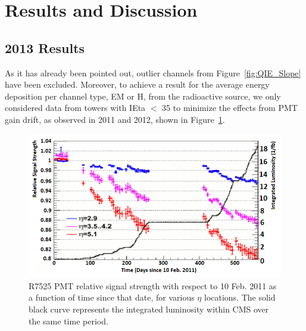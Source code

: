 \section{Results and Discussion}
\subsection{2013 Results}
As it has already been pointed out, outlier channels from Figure~\ref{fig:QIE_Slope} have been excluded.
Moreover, to achieve a result for the average energy deposition per channel type,
EM or H, from the radioactive source, we only considered data from towers with
IEta $<$ 35 to minimize the effects from PMT gain drift, as observed in 2011 and
2012, shown in Figure~\ref{fig:PMT_Drift}.

\begin{figure}[htb]
   \begin{center}
      \includegraphics[width=.75\textwidth]{figures/ch_hfcalibration/PMT_Drift.png}
      \caption{R7525 PMT relative signal strength with respect to 10 Feb. 2011 as a
      function of time since that date, for various $\eta$ locations. The solid
      black curve represents the integrated luminosity within CMS over the same
      time period.}
      \label{fig:PMT_Drift}
   \end{center}
\end{figure}

